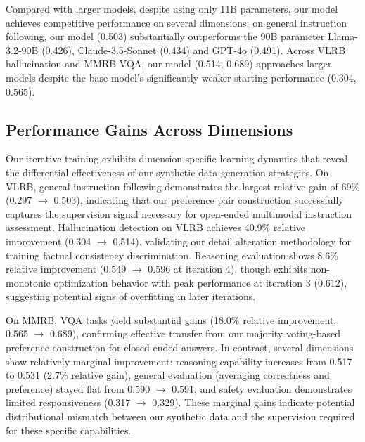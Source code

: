 Compared with larger models, despite using only 11B parameters, our model achieves competitive performance on several dimensions: on general instruction following, our model (0.503) substantially outperforms the 90B parameter Llama-3.2-90B (0.426), Claude-3.5-Sonnet (0.434) and GPT-4o (0.491). Across VLRB hallucination and MMRB VQA, our model (0.514, 0.689) approaches larger models despite the base model's significantly weaker starting performance (0.304, 0.565).

\subsection{Performance Gains Across Dimensions}

Our iterative training exhibits dimension-specific learning dynamics that reveal the differential effectiveness of our synthetic data generation strategies. On VLRB, general instruction following demonstrates the largest relative gain of 69\% (0.297 $\rightarrow$ 0.503), indicating that our preference pair construction successfully captures the supervision signal necessary for open-ended multimodal instruction assessment. Hallucination detection on VLRB achieves 40.9\% relative improvement (0.304 $\rightarrow$ 0.514), validating our detail alteration methodology for training factual consistency discrimination. Reasoning evaluation shows 8.6\% relative improvement (0.549 $\rightarrow$ 0.596 at iteration 4), though exhibits non-monotonic optimization behavior with peak performance at iteration 3 (0.612), suggesting potential signs of overfitting in later iterations.

On MMRB, VQA tasks yield substantial gains (18.0\% relative improvement, 0.565 $\rightarrow$ 0.689), confirming effective transfer from our majority voting-based preference construction for closed-ended answers. In contrast, several dimensions show relatively marginal improvement: reasoning capability increases from 0.517 to 0.531 (2.7\% relative gain), general evaluation (averaging correctness and preference) stayed flat from 0.590 $\rightarrow$ 0.591, and safety evaluation demonstrates limited responsiveness (0.317 $\rightarrow$ 0.329). These marginal gains indicate potential distributional mismatch between our synthetic data and the supervision required for these specific capabilities.

